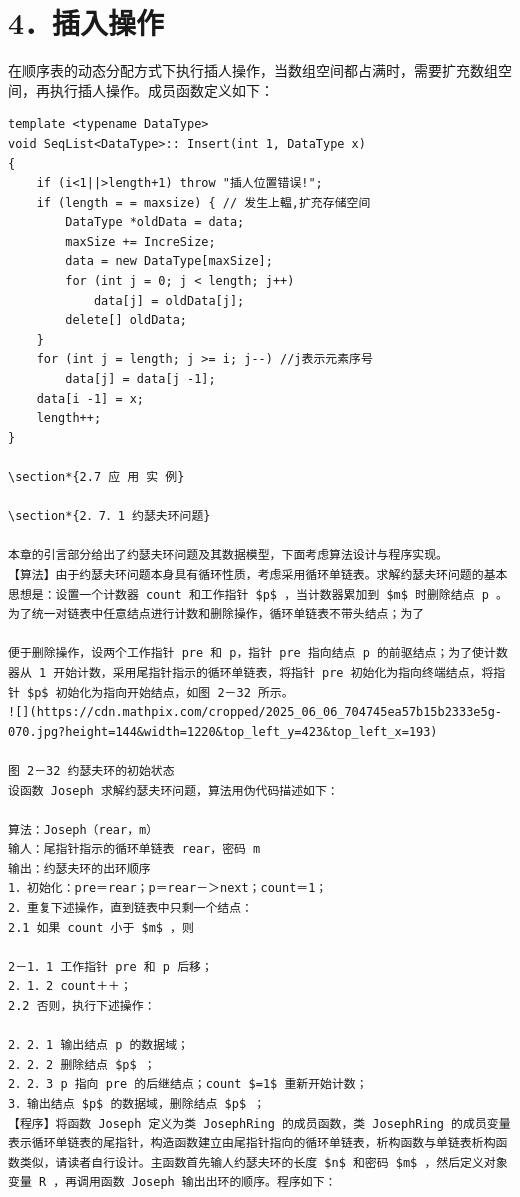 \documentclass[10pt]{article}
\begin{document}
\section*{4．插入操作}
在顺序表的动态分配方式下执行插人操作，当数组空间都占满时，需要扩充数组空间，再执行插人操作。成员函数定义如下：

\begin{verbatim}
template <typename DataType>
void SeqList<DataType>:: Insert(int 1, DataType x)
{
    if (i<1||>length+1) throw "插人位置错误!";
    if (length = = maxsize) { // 发生上輼,扩充存储空间
        DataType *oldData = data;
        maxSize += IncreSize;
        data = new DataType[maxSize];
        for (int j = 0; j < length; j++)
            data[j] = oldData[j];
        delete[] oldData;
    }
    for (int j = length; j >= i; j--) //j表示元素序号
        data[j] = data[j -1];
    data[i -1] = x;
    length++;
}

\section*{2.7 应 用 实 例}

\section*{2．7．1 约瑟夫环问题}

本章的引言部分给出了约瑟夫环问题及其数据模型，下面考虑算法设计与程序实现。
【算法】由于约瑟夫环问题本身具有循环性质，考虑采用循环单链表。求解约瑟夫环问题的基本思想是：设置一个计数器 count 和工作指针 $p$ ，当计数器累加到 $m$ 时删除结点 p 。为了统一对链表中任意结点进行计数和删除操作，循环单链表不带头结点；为了

便于删除操作，设两个工作指针 pre 和 p，指针 pre 指向结点 p 的前驱结点；为了使计数器从 1 开始计数，采用尾指针指示的循环单链表，将指针 pre 初始化为指向终端结点，将指针 $p$ 初始化为指向开始结点，如图 2－32 所示。
![](https://cdn.mathpix.com/cropped/2025_06_06_704745ea57b15b2333e5g-070.jpg?height=144&width=1220&top_left_y=423&top_left_x=193)

图 2－32 约瑟夫环的初始状态
设函数 Joseph 求解约瑟夫环问题，算法用伪代码描述如下：

算法：Joseph（rear，m）
输人：尾指针指示的循环单链表 rear，密码 m
输出：约瑟夫环的出环顺序
1．初始化：pre＝rear；p＝rear－＞next；count＝1；
2．重复下述操作，直到链表中只剩一个结点：
2.1 如果 count 小于 $m$ ，则

2－1．1 工作指针 pre 和 p 后移；
2．1．2 count＋＋；
2.2 否则，执行下述操作：

2．2．1 输出结点 p 的数据域；
2．2．2 删除结点 $p$ ；
2．2．3 p 指向 pre 的后继结点；count $=1$ 重新开始计数；
3．输出结点 $p$ 的数据域，删除结点 $p$ ；
【程序】将函数 Joseph 定义为类 JosephRing 的成员函数，类 JosephRing 的成员变量表示循环单链表的尾指针，构造函数建立由尾指针指向的循环单链表，析构函数与单链表析构函数类似，请读者自行设计。主函数首先输人约瑟夫环的长度 $n$ 和密码 $m$ ，然后定义对象变量 R ，再调用函数 Joseph 输出出环的顺序。程序如下：
\end{verbatim}
\end{document}
